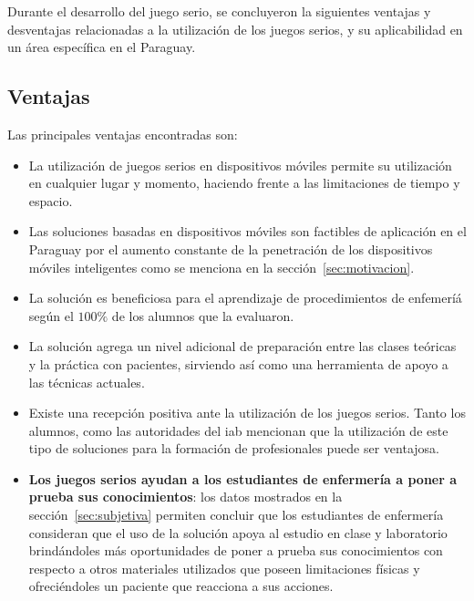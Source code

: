 Durante el desarrollo del juego serio, se concluyeron la siguientes ventajas y desventajas relacionadas a la utilización de los juegos serios, y su aplicabilidad en un área específica en el Paraguay.

\subsection{Ventajas}

Las principales ventajas encontradas son:

\begin{itemize}

\item La utilización de juegos serios en dispositivos móviles permite su utilización en cualquier lugar y momento, haciendo frente a las limitaciones de tiempo y espacio.

\item Las soluciones basadas en dispositivos móviles son factibles de aplicación en el Paraguay por el aumento constante de la penetración de los dispositivos móviles inteligentes como se menciona en la sección~\ref{sec:motivacion}.

\item La solución es beneficiosa para el aprendizaje de procedimientos de enfemeríá según el $100\%$ de los alumnos que la evaluaron.

\item La solución agrega un nivel adicional de preparación entre las clases teóricas y la práctica con pacientes, sirviendo así como una herramienta de apoyo a las técnicas actuales.

\item Existe una recepción positiva ante la utilización de los juegos serios. Tanto los alumnos, como las autoridades del \gls{iab} mencionan que la utilización de este tipo de soluciones para la formación de profesionales puede ser ventajosa.

\item \textbf{Los juegos serios ayudan a los estudiantes de enfermería a poner a prueba sus conocimientos}: los datos mostrados en la sección~\ref{sec:subjetiva} permiten concluir que los estudiantes de enfermería consideran que el uso de la solución apoya al estudio en clase y laboratorio brindándoles más oportunidades de poner a prueba sus conocimientos con respecto a otros materiales utilizados que poseen limitaciones físicas y ofreciéndoles un paciente que reacciona a sus acciones. 

\end{itemize}

